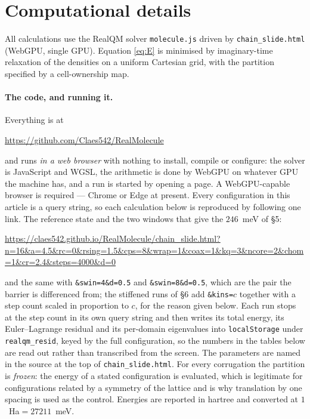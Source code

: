 \documentclass[11pt]{article}
\begin{document}
\appendix
\section{Computational details}\label{sec:details}

All calculations use the RealQM solver \texttt{molecule.js} driven by \texttt{chain\_slide.html}
(WebGPU, single GPU). Equation \eqref{eq:E} is minimised by imaginary-time relaxation of the
densities on a uniform Cartesian grid, with the partition specified by a cell-ownership map.

\paragraph{The code, and running it.} Everything is at
\begin{center}\small\url{https://github.com/Claes542/RealMolecule}\end{center}
and runs \emph{in a web browser} with nothing to install, compile or configure: the solver is
JavaScript and WGSL, the arithmetic is done by WebGPU on whatever GPU the machine has, and a run is
started by opening a page. A WebGPU-capable browser is required --- Chrome or Edge at present. Every
configuration in this article is a query string, so each calculation below is reproduced by following
one link. The reference state and the two windows that give the $246$~meV of \S5:
\begin{center}\small
\url{https://claes542.github.io/RealMolecule/chain_slide.html?n=16&a=4.5&rc=0&rsing=1.5&cps=8&wrap=1&coax=1&kq=3&ncore=2&chom=1&cr=2.4&steps=4000&d=0}
\end{center}
and the same with \texttt{\&swin=4\&d=0.5} and \texttt{\&swin=8\&d=0.5}, which are the pair the
barrier is differenced from; the stiffened runs of \S6 add \texttt{\&kins=$c$} together with a step
count scaled in proportion to $c$, for the reason given below. Each run stops at the step count in
its own query string and then writes its total energy, its Euler--Lagrange residual and its
per-domain eigenvalues into
\texttt{localStorage} under \texttt{realqm\_resid}, keyed by the full configuration, so the numbers in
the tables below are read out rather than transcribed from the screen. The parameters are named in
the source at the top of \texttt{chain\_slide.html}. For
every corrugation the partition is \emph{frozen}: the energy of a stated configuration is evaluated,
which is legitimate for configurations related by a symmetry of the lattice and is why translation by
one spacing is used as the control. Energies are reported in hartree and converted at
$1$~Ha${}=27211$~meV.
\end{document}

